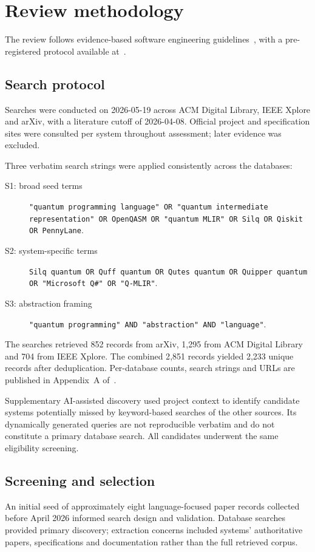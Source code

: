 \section{Review methodology}\label{sec:methodology}
The review follows evidence-based software engineering guidelines~\cite{KitchenhamCharters2007SLR}, with a pre-registered protocol available at~\cite{kavadias2026qplSurveyProtocol}.

\subsection{Search protocol}\label{subsec:methodology:search_protocol}
Searches were conducted on 2026-05-19 across ACM Digital Library, IEEE Xplore and arXiv, with a literature cutoff of 2026-04-08.
Official project and specification sites were consulted per system throughout assessment; later evidence was excluded.

Three verbatim search strings were applied consistently across the databases:
\begin{description}
    \item[S1: broad seed terms] \texttt{"quantum programming language" OR "quantum intermediate representation" OR OpenQASM OR "quantum MLIR" OR Silq OR Qiskit OR PennyLane}.
    \item[S2: system-specific terms] \texttt{Silq quantum OR Quff quantum OR Qutes quantum OR Quipper quantum OR "Microsoft Q\#" OR "Q-MLIR"}.
    \item[S3: abstraction framing] \texttt{"quantum programming" AND "abstraction" AND "language"}.
\end{description}
The searches retrieved 852 records from arXiv, 1{,}295 from ACM Digital Library and 704 from IEEE Xplore.
The combined 2{,}851 records yielded 2{,}233 unique records after deduplication.
Per-database counts, search strings and URLs are published in Appendix~A of~\cite{kavadias2026qplSurveySupplementary}.

Supplementary AI-assisted discovery used project context to identify candidate systems potentially missed by keyword-based searches of the other sources.
Its dynamically generated queries are not reproducible verbatim and do not constitute a primary database search.
All candidates underwent the same eligibility screening.

\subsection{Screening and selection}\label{subsec:methodology:screening}
An initial seed of approximately eight language-focused paper records collected before April 2026 informed search design and validation.
Database searches provided primary discovery; extraction concerns included systems' authoritative papers, specifications and documentation rather than the full retrieved corpus.

